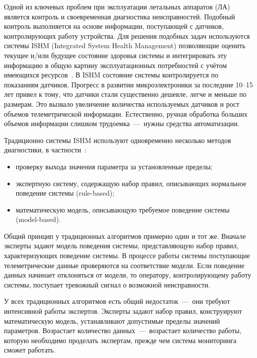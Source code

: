 Одной из ключевых проблем при эксплуатации летальных аппаратов (ЛА) является контроль и своевременная диагностика неисправностей. Подобный контроль выполняется на основе информации, поступающей с датчиков, контролирующих работу устройства. Для решения подобных задач используются системы ISHM (Integrated System Health Management) позволяющие оценить текущее и/или будущее состояние здоровья системы и интегрировать эту информацию в общую картину эксплуатационных потребностей с учётом имеющихся ресурсов~\cite{JennionsIVHM}. В ISHM состояние системы контролируется по показаниям датчиков. Прогресс в развитии микроэлектроники за последние 10--15 лет привел к тому, что датчики стали существенно дешевле, легче и меньше по размерам. Это вызвало увеличение количества используемых датчиков и рост объемов телеметрической информации. Естественно, ручная обработка больших объемов информации слишком трудоемка~–--~нужны средства автоматизации.

Традиционно системы ISHM используют одновременно несколько методов диагностики, в частности~\cite{FaultDetectionByMiningAssocRules}:
\begin{itemize}
	\item проверку выхода значения параметра за установленные пределы;
	\item экспертную систему, содержащую набор правил, описывающих нормальное поведение системы (rule-based);
	\item математическую модель, описывающую требуемое поведение системы (model-based).
\end{itemize}

Общий принцип у традиционных алгоритмов примерно один и тот же. Вначале эксперты задают модель поведения системы, представляющую набор правил, характеризующих поведение системы. В процессе работы системы поступающие телеметрические данные проверяются на соответствие модели. Если поведение данных начинает отклоняться от модели, то оператору, контролирующему работу системы, поступает тревожный сигнал о возможной неисправности.

У всех традиционных алгоритмов есть общий недостаток~–--~они требуют  интенсивной работы экспертов. Эксперты задают набор правил, конструируют  математическую модель, устанавливают допустимые пределы значений параметров. Возрастает количество данных~–--~возрастает количество работы, которую необходимо проделать экспертам, прежде чем система мониторинга сможет работать.

